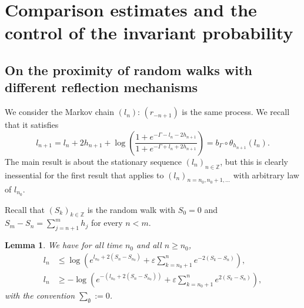 \documentclass[10pt]{amsart}
\newtheorem{lemm}[theo]{Lemma}\newtheorem{prop}[theo]{Proposition}\newtheorem{coro}[theo]{Corollary}\newtheorem{conj}[theo]{Conjecture}
\theoremstyle{definition}\newtheorem{defi}[theo]{Definition}\newtheorem{rema}[theo]{Remark}\newtheorem{exam}[theo]{Example}\newtheorem{exem}[theo]{Example}\newtheorem{nota}[theo]{Notation}
\newcommand{\bbZ}{\mathbb{Z}}
\newcommand{\gep}{\varepsilon}
\newcommand{\gG}{\Gamma}
\begin{document}
\section{Comparison estimates and the control of the invariant probability }\label{sec:comp-nu}


\subsection{On the proximity of random walks with different reflection mechanisms}\label{sec:comp}
We consider the Markov chain $(l_n)$: $(r_{-n+1})$ is the same process. We recall that it satisfies
\begin{equation}
l_{n+1}= l_n+2h_{n+1}+ \log \left(\frac{1+ e^{-\gG -l_n-2h_{n+1}}}{1+ e^{-\gG +l_n+2h_{n+1}}} \right)= b_\gG\circ \theta_{h_{n+1}}(l_n).
\end{equation}
The main result is about the stationary sequence $(l_n)_{n \in \bbZ}$, but this is clearly inessential for the first result that applies to $(l_n)_{n=n_0, n_0+1, \dots}$ with arbitrary law of $l_{n_0}$.

Recall that $(S_k)_{k\in \bbZ}$ is the random walk with $S_0=0$ and $S_{m}-S_n= \sum_{j=n+1}^m h_j$ for every $n< m$.

\begin{lemm}\label{th:forNrandom}
We have for all time $n_0$ and all $n\ge n_0$,
\begin{align}
l_n &\le \log\left(e^{l_{n_0}+ 2 \left(S_n-S_{n_0}\right)} + \gep \sum_{k={n_0}+1}^{n} e^{-2(S_k-S_{n})} \right), \label{eq:ln<}
\\
l_n &\ge -\log \left(e^{-\left(l_{n_0}+ 2 (S_n-S_{n_0})\right)}+ \gep \sum_{k={n_0}+1}^{n} e^{2(S_k-S_{n})} \right), \label{eq:ln>}
\end{align}
with the convention $\sum_\emptyset:=0$.
\end{lemm}
\end{document}
